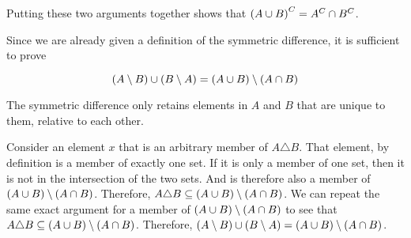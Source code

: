 \documentclass{article}
\begin{document}
Putting these two arguments together shows that $\left (A\cup B \right)^C = A^C \cap B^C$.


Since we are already given a definition of the symmetric difference, it is sufficient to prove

$$
\left (A \setminus B \right) \cup \left (B \setminus A \right) = \left (A \cup B \right) \setminus \left (A \cap B \right)
$$

The symmetric difference only retains elements in $A$ and $B$ that are unique to them, relative to each other.

Consider an element $x$ that is an arbitrary member of $A\triangle B$.
That element, by definition is a member of exactly one set.
If it is only a member of one set, then it is not in the intersection of the two sets.
And is therefore also a member of $\left (A \cup B \right) \setminus \left (A \cap B \right)$.
Therefore, $A\triangle B \subseteq \left (A \cup B \right) \setminus \left (A \cap B \right)$.
We can repeat the same exact argument for a member of $\left (A \cup B \right) \setminus \left (A \cap B \right)$ to see that $A \triangle B \subseteq \left (A \cup B \right) \setminus \left (A \cap B \right)$.
Therefore, $\left (A \setminus B \right) \cup \left (B \setminus A \right) = \left (A \cup B \right) \setminus \left (A \cap B \right)$.
\end{document}
